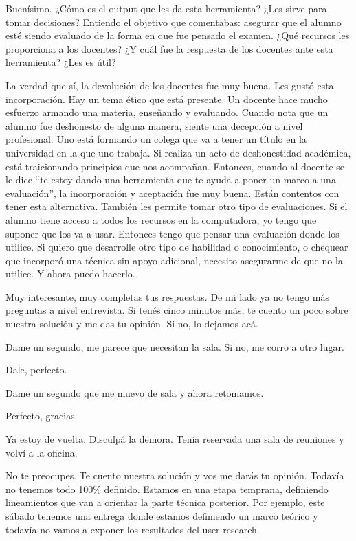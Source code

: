\begin{description}[leftmargin=0cm, labelsep=0.5cm, style=nextline]
\item[\textbf{Entrevistadores:}] Buenísimo. ¿Cómo es el output que les da esta herramienta? ¿Les sirve para tomar decisiones? Entiendo el objetivo que comentabas: asegurar que el alumno esté siendo evaluado de la forma en que fue pensado el examen. ¿Qué recursos les proporciona a los docentes? ¿Y cuál fue la respuesta de los docentes ante esta herramienta? ¿Les es útil?
\item[\textbf{Entrevistada:}] La verdad que sí, la devolución de los docentes fue muy buena. Les gustó esta incorporación. Hay un tema ético que está presente. Un docente hace mucho esfuerzo armando una materia, enseñando y evaluando. Cuando nota que un alumno fue deshonesto de alguna manera, siente una decepción a nivel profesional.
Uno está formando un colega que va a tener un título en la universidad en la que uno trabaja. Si realiza un acto de deshonestidad académica, está traicionando principios que nos acompañan. Entonces, cuando al docente se le dice ``te estoy dando una herramienta que te ayuda a poner un marco a una evaluación'', la incorporación y aceptación fue muy buena.
Están contentos con tener esta alternativa. También les permite tomar otro tipo de evaluaciones. Si el alumno tiene acceso a todos los recursos en la computadora, yo tengo que suponer que los va a usar. Entonces tengo que pensar una evaluación donde los utilice.
Si quiero que desarrolle otro tipo de habilidad o conocimiento, o chequear que incorporó una técnica sin apoyo adicional, necesito asegurarme de que no la utilice. Y ahora puedo hacerlo.
\item[\textbf{Entrevistadores:}] Muy interesante, muy completas tus respuestas. De mi lado ya no tengo más preguntas a nivel entrevista. Si tenés cinco minutos más, te cuento un poco sobre nuestra solución y me das tu opinión. Si no, lo dejamos acá.
\item[\textbf{Entrevistada:}] Dame un segundo, me parece que necesitan la sala. Si no, me corro a otro lugar.
\item[\textbf{Entrevistadores:}] Dale, perfecto.
\item[\textbf{Entrevistada:}] Dame un segundo que me muevo de sala y ahora retomamos.
\item[\textbf{Entrevistadores:}] Perfecto, gracias.
\item[\textbf{Entrevistada:}] Ya estoy de vuelta. Disculpá la demora. Tenía reservada una sala de reuniones y volví a la oficina.
\item[\textbf{Entrevistadores:}] No te preocupes. Te cuento nuestra solución y vos me darás tu opinión. Todavía no tenemos todo 100\% definido. Estamos en una etapa temprana, definiendo lineamientos que van a orientar la parte técnica posterior. Por ejemplo, este sábado tenemos una entrega donde estamos definiendo un marco teórico y todavía no vamos a exponer los resultados del user research.

\end{description}
